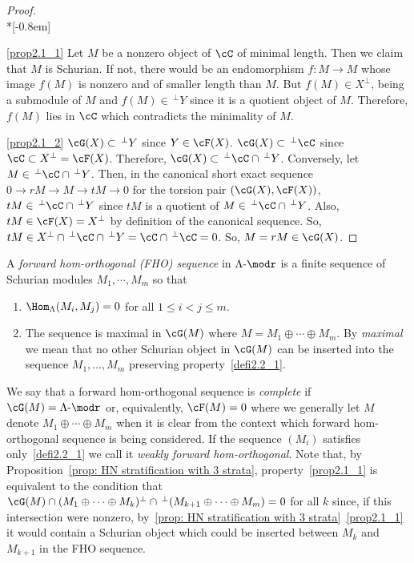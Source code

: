 \begin{proof} \ \\*[-0.8em]

 \eqref{prop2.1_1} Let $M$ be a nonzero object of $\cC$ of minimal length. Then we claim that $M$ is Schurian. If not, there would be an endomorphism $f:M\to M$ whose image $f(M)$ is nonzero and of smaller length than $M$. But $f(M)\in X^\perp$, being a submodule of $M$ and $f(M)\in \,^\perp Y$ since it is a quotient object of $M$. Therefore, $f(M)$ lies in $\cC$ which contradicts the minimality of $M$.

\eqref{prop2.1_2} $\cG(X)\subset \,^\perp Y$ since $Y\in \cF(X)$. $\cG(X)\subset \,^\perp \cC$ since $\cC\subset  X^\perp=\cF(X)$. Therefore, $\cG(X)\subset \,^\perp\cC\cap \,^\perp Y$. Conversely, let $M\in \,^\perp \cC\cap\,^\perp Y$. Then, in the canonical short exact sequence $0\to rM\to M\to tM\to 0$ for the torsion pair $(\cG(X),\cF(X))$, $tM\in  \,^\perp \cC\cap\,^\perp Y$ since $tM$ is a quotient of $M\in \,^\perp \cC\cap\,^\perp Y$. Also, $tM\in \cF(X)= X^\perp$ by definition of the canonical sequence. So, $tM\in X^\perp\cap \,^\perp\cC\cap\,^\perp Y=\cC\cap \,^\perp \cC=0$. So, $M=rM\in\cG(X)$.
\end{proof}

\begin{defi}\label{def of FHO}
A \emph{forward hom-orthogonal (FHO) sequence} in $\Lambda\text{-}\modr$ is a finite sequence of Schurian modules $M_1, \cdots, M_m$ so that
\begin{enumerate}
\item\label{defi2.2_1} $\Hom_\Lambda(M_i,M_j)=0$ for all $1\le i<j\le m$.
\item\label{defi2.2_2} The sequence is maximal in $\cG(M)$ where $M=M_1\oplus \cdots\oplus M_m$. By \emph{maximal} we mean that no other Schurian object in $\cG(M)$ can be inserted into the sequence $M_1,\ldots,M_m$ preserving property~\eqref{defi2.2_1}.
\end{enumerate}
We say that a forward hom-orthogonal sequence is \emph{complete} if $\cG(M)=\Lambda\text{-}\modr$ or, equivalently, $\cF(M)=0$ where we generally let $M$ denote $M_1\oplus\cdots\oplus M_m$ when it is clear from the context which forward hom-orthogonal sequence is being considered. If the sequence $(M_i)$ satisfies only~\eqref{defi2.2_1} we call it \emph{weakly forward hom-orthogonal}. Note that, by Proposition~\ref{prop: HN stratification with 3 strata}, property~\eqref{prop2.1_1} is equivalent to the condition that $\cG(M)\cap(M_1\oplus \cdots \oplus M_k)^\perp\cap\,^\perp(M_{k+1}\oplus\cdots\oplus M_m)=0$ for all $k$ since, if this intersection were nonzero, by~\ref{prop: HN stratification with 3 strata}~\eqref{prop2.1_1} it would contain a Schurian object which could be inserted between $M_k$ and $M_{k+1}$ in the FHO sequence.
\end{defi}

